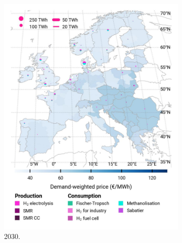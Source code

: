 \documentclass[preprint,12pt,sort&compress]{elsarticle}
\begin{document}
\cleardoublepage


\begin{figure}[htbp]
  \centering
  \begin{subfigure}[t]{0.33\textwidth}
      \vspace{0pt}
      \includegraphics[width=1\textwidth]{maps/no-pipelines-no-pcipmi/base_s_adm___2030-balance_map_H2}
      \caption{ 2030.}
      \label{fig:DI_lt_2030_h2}
  \end{subfigure}
  \begin{subfigure}[t]{0.33\textwidth}
      \vspace{0pt}

\end{subfigure}
\end{figure}
\end{document}
